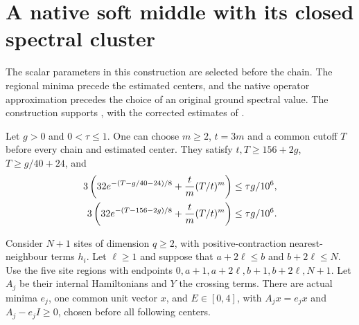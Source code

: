 \section{A native soft middle with its closed spectral cluster}

The scalar parameters in this construction are selected before the chain.
The regional minima precede the estimated centers, and the native operator
approximation precedes the choice of an original ground spectral value.
The construction supports \cite[Proposition~5.7 and Theorem~5.8]{Arad2016RigorousRG},
with the corrected estimates of
\cite{gap:alvv16_cluster_approximation,gap:alvv16_soft_regional_residuals}.

\begin{lemma}
    \label{lem:physical_soft_middle_cluster}
    \leanok
    Let $g>0$ and $0<\tau\le1$. One can choose $m\ge2$, $t=3m$ and
    a common cutoff $T$ before every chain and estimated center. They
    satisfy $t,T\ge156+2g$, $T\ge g/40+24$, and
    \begin{align}
        3\left(32e^{-(T-g/40-24)/8}+\frac{t}{m}(T/t)^m\right)
         & \le\tau g/10^6,\notag \\
        3\left(32e^{-(T-156-2g)/8}+\frac{t}{m}(T/t)^m\right)
         & \le\tau g/10^6.
        \label{eq:physical_soft_middle_parameters}
    \end{align}

    Consider $N+1$ sites of dimension $q\ge2$, with positive-contraction
    nearest-neighbour terms $h_i$. Let $\ell\ge1$ and suppose that
    $a+2\ell\le b$ and $b+2\ell\le N$. Use the five site regions with
    endpoints $0,a+1,a+2\ell,b+1,b+2\ell,N+1$. Let $A_j$ be their
    internal Hamiltonians and $Y$ the crossing terms. There are actual
    minima $e_j$, one common unit vector $x$, and $E\in[0,4]$, with
    $A_jx=e_jx$ and $A_j-e_jI\ge0$, chosen before all following centers.


\end{lemma}
